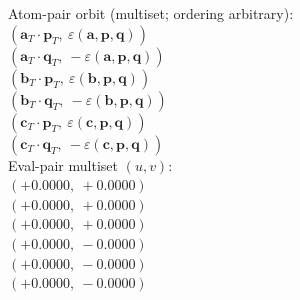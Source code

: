 \documentclass[a4paper,11pt]{article}
\newcommand{\fpbeomcfokjooi}[2]{\mathbf{#1}_T \cdot \mathbf{#2}_T}
\newcommand{\kblbmcpggoncpf}[3]{\varepsilon(\mathbf{#1},\mathbf{#2},\mathbf{#3})}
\begin{document}
\quad Atom-pair orbit (multiset; ordering arbitrary):\\
$(\fpbeomcfokjooi{a}{p},\ \kblbmcpggoncpf{a}{p}{q})$\\
$(\fpbeomcfokjooi{a}{q},\ -\kblbmcpggoncpf{a}{p}{q})$\\
$(\fpbeomcfokjooi{b}{p},\ \kblbmcpggoncpf{b}{p}{q})$\\
$(\fpbeomcfokjooi{b}{q},\ -\kblbmcpggoncpf{b}{p}{q})$\\
$(\fpbeomcfokjooi{c}{p},\ \kblbmcpggoncpf{c}{p}{q})$\\
$(\fpbeomcfokjooi{c}{q},\ -\kblbmcpggoncpf{c}{p}{q})$\\
\quad Eval-pair multiset $(u, v)$:\\
$(+0.0000,\ +0.0000)$\\
$(+0.0000,\ +0.0000)$\\
$(+0.0000,\ +0.0000)$\\
$(+0.0000,\ -0.0000)$\\
$(+0.0000,\ -0.0000)$\\
$(+0.0000,\ -0.0000)$\\
\end{document}
